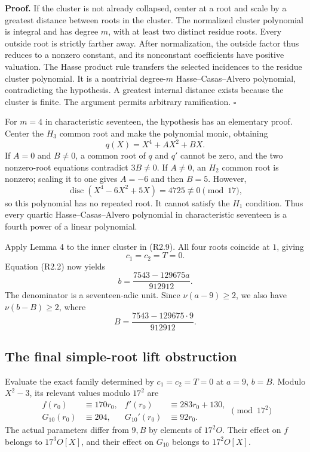 \documentclass[
  british,
  10pt,
  a4paper,
]{article}
\begin{document}
\textbf{Proof.} If the cluster is not already collapsed, center at a
root and scale by a greatest distance between roots in the cluster. The
normalized cluster polynomial is integral and has degree \(m\), with at
least two distinct residue roots. Every outside root is strictly farther
away. After normalization, the outside factor thus reduces to a nonzero
constant, and its nonconstant coefficients have positive valuation. The
Hasse product rule transfers the selected incidences to the residue
cluster polynomial. It is a nontrivial degree-\(m\) Hasse--Casas--Alvero
polynomial, contradicting the hypothesis. A greatest internal distance
exists because the cluster is finite. The argument permits arbitrary
ramification. \(\square\)

For \(m=4\) in characteristic seventeen, the hypothesis has an
elementary proof. Center the \(H_3\) common root and make the polynomial
monic, obtaining \[
q(X)=X^4+AX^2+BX.
\] If \(A=0\) and \(B\ne0\), a common root of \(q\) and \(q'\) cannot be
zero, and the two nonzero-root equations contradict \(3B\ne0\). If
\(A\ne0\), an \(H_2\) common root is nonzero; scaling it to one gives
\(A=-6\) and then \(B=5\). However, \[
\operatorname{disc}(X^4-6X^2+5X)=4725\not\equiv0\pmod{17},
\] so this polynomial has no repeated root. It cannot satisfy the
\(H_1\) condition. Thus every quartic Hasse--Casas--Alvero polynomial in
characteristic seventeen is a fourth power of a linear polynomial.

Apply Lemma 4 to the inner cluster in (R2.9). All four roots coincide at
\(1\), giving \[
c_1=c_2=T=0.
\] Equation (R2.2) now yields \[
b=\frac{7543-129675a}{912912}.
\tag{R2.10}
\] The denominator is a seventeen-adic unit. Since \(\nu(a-9)\ge2\), we
also have \(\nu(b-B)\ge2\), where \[
B=\frac{7543-129675\cdot9}{912912}.
\tag{R2.11}
\]

\subsection{The final simple-root lift
obstruction}\label{the-final-simple-root-lift-obstruction}

Evaluate the exact family determined by \(c_1=c_2=T=0\) at \(a=9\),
\(b=B\). Modulo \(X^2-3\), its relevant values modulo \(17^2\) are \[
\begin{aligned}
f(r_0)&\equiv170r_0,&
f'(r_0)&\equiv283r_0+130,\\
G_{10}(r_0)&\equiv204,&
G_{10}'(r_0)&\equiv92r_0.
\end{aligned}
\pmod{17^2}
\tag{R2.12}
\] The actual parameters differ from \(9,B\) by elements of \(17^2O\).
Their effect on \(f\) belongs to \(17^3O[X]\), and their effect on
\(G_{10}\) belongs to \(17^2O[X]\).
\end{document}
